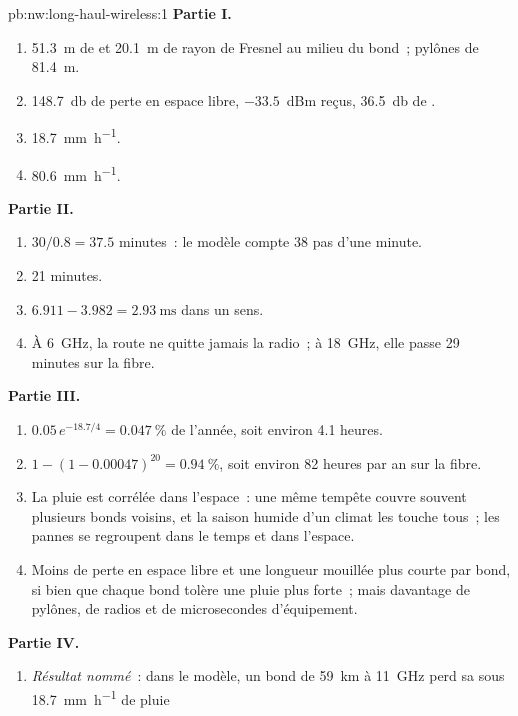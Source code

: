 \begin{solution}{pb:nw:long-haul-wireless:1}
\textbf{Partie I.}
\begin{enumerate}
\item \qty{51.3}{\metre} de  et \qty{20.1}{\metre} de rayon de Fresnel au milieu du bond~; pylônes de \qty{81.4}{\metre}.
\item \qty{148.7}{\decibel} de perte en espace libre, $-33.5$~dBm reçus, \qty{36.5}{\decibel} de .
\item \qty{18.7}{\milli\metre\per\hour}.
\item \qty{80.6}{\milli\metre\per\hour}.
\end{enumerate}
\textbf{Partie II.}
\begin{enumerate}[resume]
\item $30/0.8 = 37.5$ minutes~: le modèle compte 38 pas d'une minute.
\item 21 minutes.
\item $6.911 - 3.982 = \qty{2.93}{\milli\second}$ dans un sens.
\item À \qty{6}{\giga\hertz}, la route ne quitte jamais la radio~; à \qty{18}{\giga\hertz}, elle passe 29 minutes sur la fibre.
\end{enumerate}
\textbf{Partie III.}
\begin{enumerate}[resume]
\item $0.05\,e^{-18.7/4} = 0.047~\%$ de l'année, soit environ 4.1 heures.
\item $1 - (1 - 0.00047)^{20} = 0.94~\%$, soit environ 82 heures par an sur la fibre.
\item La pluie est corrélée dans l'espace~: une même tempête couvre souvent plusieurs bonds voisins, et la saison humide d'un climat les touche tous~; les pannes se regroupent dans
  le temps et dans l'espace.
\item Moins de perte en espace libre et une longueur mouillée plus courte par bond, si bien que chaque bond tolère une pluie plus forte~; mais davantage de pylônes, de radios et de
  microsecondes d'équipement.
\end{enumerate}
\textbf{Partie IV.}
\begin{enumerate}[resume]
\item \emph{Résultat nommé}~: dans le modèle, un bond de \qty{59}{\kilo\metre} à \qty{11}{\giga\hertz} perd sa  sous \qty{18.7}{\milli\metre\per\hour} de pluie

\end{enumerate}
\end{solution}
